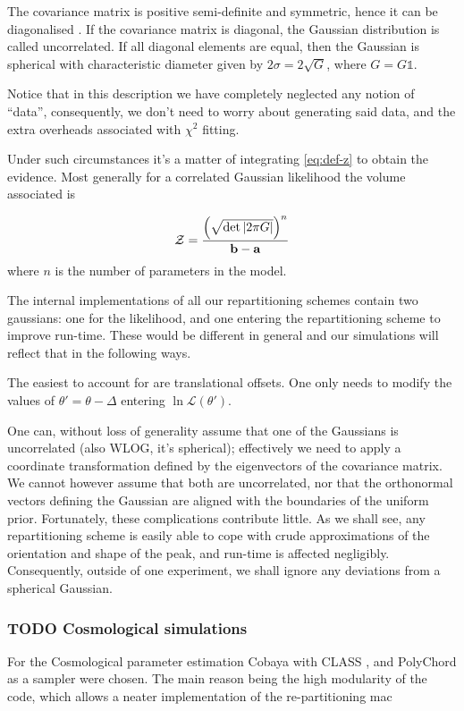 \documentclass[usenatbib]{mnras}
\begin{document}
The covariance matrix is positive semi-definite and symmetric,
hence it can be diagonalised \citep{taboga2017lectures}. If the
covariance matrix is diagonal, the Gaussian distribution is called
uncorrelated. If all diagonal elements are equal, then the
Gaussian is spherical with characteristic diameter given by \(2
	\sigma = 2\sqrt{G}\), where \(G = G \mathds{1}\).

Notice that in this description we have completely neglected any
notion of ``data'', consequently, we don't need to worry about
generating said data, and the extra overheads associated with
\(\chi^2\) fitting.

Under such circumstances it's a matter of integrating \ref{eq:def-z}
to obtain the evidence. Most generally for a correlated Gaussian
likelihood the volume associated is 

\begin{equation}\label{eq:evidence}
   {\cal Z} = \frac{\left( \sqrt{ \det \left| 2\pi G \right|} \right)^{n}}{\mathbf{b}-\mathbf{a}}  
\end{equation}
where \(n\) is the number of parameters in the model.

The internal implementations of all our repartitioning schemes
contain two gaussians: one for the likelihood, and one
entering the repartitioning scheme to improve run-time. These
would be different in general and our simulations will reflect
that in the following ways.

The easiest to account for are translational offsets. One only needs to
modify the values of \(\theta' = \theta - \Delta\) entering \(\ln
	\mathcal{L}(\theta')\). 

One can, without loss of generality assume that one of the
Gaussians is uncorrelated (also WLOG, it's spherical);
effectively we need to apply a coordinate transformation
defined by the eigenvectors of the covariance matrix. We
cannot however assume that both are uncorrelated, nor that the
orthonormal vectors defining the Gaussian are aligned with the
boundaries of the uniform prior. Fortunately, these
complications contribute little. As we shall see, any
repartitioning scheme is easily able to cope with crude
approximations of the orientation and shape of the peak, and
run-time is affected negligibly. Consequently, outside of one
experiment, we shall ignore any deviations from a spherical
Gaussian.





\subsubsection{{\bfseries\sffamily TODO} Cosmological simulations}
\label{sec:orge449cd8}
For the Cosmological parameter estimation Cobaya \citep{cobaya} with
CLASS \citep{Blas_2011}, and PolyChord \citep{polychord} as a sampler
were chosen. The main reason being the high modularity of the code,
which allows a neater implementation of the re-partitioning
mac
\end{document}
